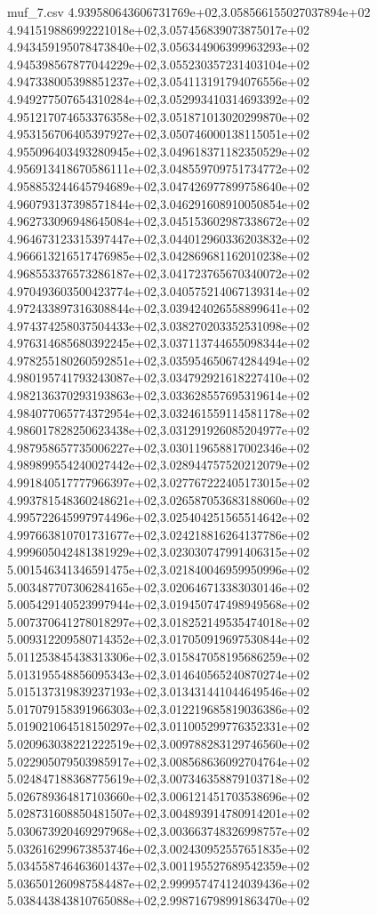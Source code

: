 \begin{filecontents*}{muf_7.csv}
4.939580643606731769e+02,3.058566155027037894e+02
4.941519886992221018e+02,3.057456839073875017e+02
4.943459195078473840e+02,3.056344906399963293e+02
4.945398567877044229e+02,3.055230357231403104e+02
4.947338005398851237e+02,3.054113191794076556e+02
4.949277507654310284e+02,3.052993410314693392e+02
4.951217074653376358e+02,3.051871013020299870e+02
4.953156706405397927e+02,3.050746000138115051e+02
4.955096403493280945e+02,3.049618371182350529e+02
4.956913418670586111e+02,3.048559709751734772e+02
4.958853244645794689e+02,3.047426977899758640e+02
4.960793137398571844e+02,3.046291608910050854e+02
4.962733096948645084e+02,3.045153602987338672e+02
4.964673123315397447e+02,3.044012960336203832e+02
4.966613216517476985e+02,3.042869681162010238e+02
4.968553376573286187e+02,3.041723765670340072e+02
4.970493603500423774e+02,3.040575214067139314e+02
4.972433897316308844e+02,3.039424026558899641e+02
4.974374258037504433e+02,3.038270203352531098e+02
4.976314685680392245e+02,3.037113744655098344e+02
4.978255180260592851e+02,3.035954650674284494e+02
4.980195741793243087e+02,3.034792921618227410e+02
4.982136370293193863e+02,3.033628557695319614e+02
4.984077065774372954e+02,3.032461559114581178e+02
4.986017828250623438e+02,3.031291926085204977e+02
4.987958657735006227e+02,3.030119658817002346e+02
4.989899554240027442e+02,3.028944757520212079e+02
4.991840517777966397e+02,3.027767222405173015e+02
4.993781548360248621e+02,3.026587053683188060e+02
4.995722645997974496e+02,3.025404251565514642e+02
4.997663810701731677e+02,3.024218816264137786e+02
4.999605042481381929e+02,3.023030747991406315e+02
5.001546341346591475e+02,3.021840046959950996e+02
5.003487707306284165e+02,3.020646713383030146e+02
5.005429140523997944e+02,3.019450747498949568e+02
5.007370641278018297e+02,3.018252149535474018e+02
5.009312209580714352e+02,3.017050919697530844e+02
5.011253845438313306e+02,3.015847058195686259e+02
5.013195548856095343e+02,3.014640565240870274e+02
5.015137319839237193e+02,3.013431441044649546e+02
5.017079158391966303e+02,3.012219685819036386e+02
5.019021064518150297e+02,3.011005299776352331e+02
5.020963038221222519e+02,3.009788283129746560e+02
5.022905079503985917e+02,3.008568636092704764e+02
5.024847188368775619e+02,3.007346358879103718e+02
5.026789364817103660e+02,3.006121451703538696e+02
5.028731608850481507e+02,3.004893914780914201e+02
5.030673920469297968e+02,3.003663748326998757e+02
5.032616299673853746e+02,3.002430952557651835e+02
5.034558746463601437e+02,3.001195527689542359e+02
5.036501260987584487e+02,2.999957474124039436e+02
5.038443843810765088e+02,2.998716798991863470e+02

\end{filecontents*}
